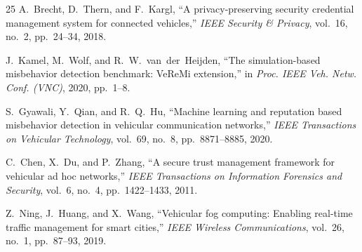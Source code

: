 \documentclass[conference]{IEEEtran}
\begin{document}
\begin{thebibliography}{25}
A.~Brecht, D.~Thern, and F.~Kargl,
``A privacy-preserving security credential management system for connected vehicles,''
\textit{IEEE Security \& Privacy}, vol.~16, no.~2, pp.~24--34, 2018.

J.~Kamel, M.~Wolf, and R.~W.~van~der~Heijden,
``The simulation-based misbehavior detection benchmark: VeReMi extension,''
in \textit{Proc. IEEE Veh. Netw. Conf. (VNC)}, 2020, pp.~1--8.

S.~Gyawali, Y.~Qian, and R.~Q.~Hu,
``Machine learning and reputation based misbehavior detection in vehicular communication networks,''
\textit{IEEE Transactions on Vehicular Technology}, vol.~69, no.~8, pp.~8871--8885, 2020.

C.~Chen, X.~Du, and P.~Zhang,
``A secure trust management framework for vehicular ad hoc networks,''
\textit{IEEE Transactions on Information Forensics and Security}, vol.~6, no.~4, pp.~1422--1433, 2011.

Z.~Ning, J.~Huang, and X.~Wang,
``Vehicular fog computing: Enabling real-time traffic management for smart cities,''
\textit{IEEE Wireless Communications}, vol.~26, no.~1, pp.~87--93, 2019.

\end{thebibliography}
\end{document}
